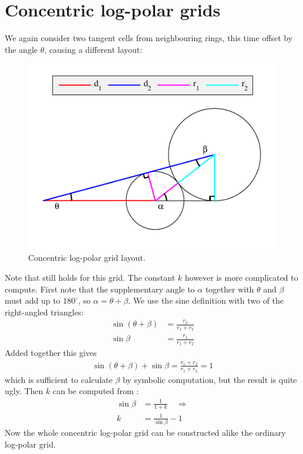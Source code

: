 \documentclass[thesis.tex]{subfiles}
\begin{document}
\section{Concentric log-polar grids}
%
We again consider two tangent cells from neighbouring rings, this time offset by the angle $\theta$, causing a different layout:
%
\begin{figure}[H]
	\centering
	\includegraphics[width=\textwidth]{img/gridLayoutDerivationConcentric.pdf}
    \caption{Concentric log-polar grid layout.}
    \label{fig:gridLayoutDerivationConcentric}
\end{figure}
\noindent
%
Note that  still holds for this grid. The constant $k$ however is more complicated to compute. First note that the supplementary angle to $\alpha$ together with $\theta$ and $\beta$ must add up to $180^\circ$, so $\alpha = \theta + \beta$. We use the sine definition with two of the right-angled triangles:
%
\begin{align}
\sin (\theta + \beta) &= \frac{r_2}{r_1 + r_2} \nonumber \\
\sin \beta &= \frac{r_1}{r_1 + r_2} \label{eq:kFromBeta}
\end{align}
%
Added together this gives
%
\begin{align*}
\sin (\theta + \beta) + \sin \beta = \frac{r_1 + r_2}{r_1 + r_2} = 1
\end{align*}
%
which is sufficient to calculate $\beta$ by symbolic computation, but the result is quite ugly. Then $k$ can be computed from :
%
\begin{align*}
\sin \beta &= \frac{1}{1 + k} \quad\Rightarrow \\
k &= \frac{1}{\sin \beta} - 1
\end{align*}
%
Now the whole concentric log-polar grid can be constructed alike the ordinary log-polar grid.
%
\end{document}

